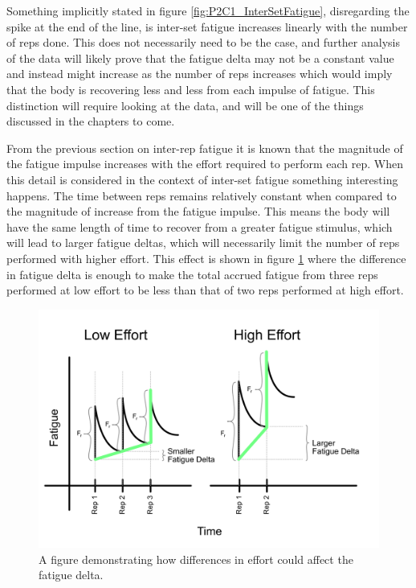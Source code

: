 Something implicitly stated in figure \ref{fig:P2C1_InterSetFatigue}, disregarding the spike at the end of the line, is inter-set fatigue increases linearly with the number of reps done. This does not necessarily need to be the case, and further analysis of the data will likely prove that the fatigue delta may not be a constant value and instead might increase as the number of reps increases which would imply that the body is recovering less and less from each impulse of fatigue. This distinction will require looking at the data, and will be one of the things discussed in the chapters to come.

From the previous section on inter-rep fatigue it is known that the magnitude of the fatigue impulse increases with the effort required to perform each rep. When this detail is considered in the context of inter-set fatigue something interesting happens. The time between reps remains relatively constant when compared to the magnitude of increase from the fatigue impulse. This means the body will have the same length of time to recover from a greater fatigue stimulus, which will lead to larger fatigue deltas, which will necessarily limit the number of reps performed with higher effort. This effect is shown in figure \ref{fig:P2C1_InterSetFatigueScaledByEffort} where the difference in fatigue delta is enough to make the total accrued fatigue from three reps performed at low effort to be less than that of two reps performed at high effort.

\begin{figure}[htb]
    \centering
    \includegraphics[scale=0.55]{images/ch2/InterSetFatigueDeltaDifference.png}
    \caption{A figure demonstrating how differences in effort could affect the fatigue delta.}
    \label{fig:P2C1_InterSetFatigueScaledByEffort}
\end{figure}

